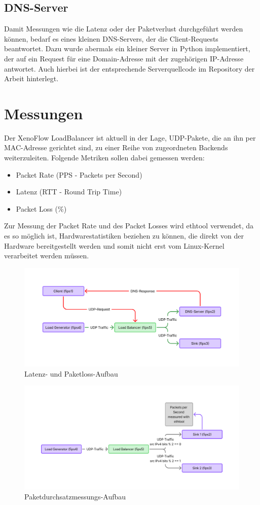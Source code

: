 \subsection{DNS-Server}
Damit Messungen wie die Latenz oder der Paketverlust durchgeführt werden können, bedarf es eines kleinen DNS-Servers, der die Client-Requests beantwortet. Dazu wurde abermals ein kleiner Server in Python implementiert, der auf ein Request für eine Domain-Adresse mit der zugehörigen IP-Adresse antwortet. Auch hierbei ist der entsprechende Serverquellcode im Repository der Arbeit hinterlegt.
\section{Messungen}
Der XenoFlow LoadBalancer ist aktuell in der Lage, UDP-Pakete, die an ihn per MAC-Adresse gerichtet sind, zu einer Reihe von zugeordneten Backends weiterzuleiten. Folgende Metriken sollen dabei gemessen werden: 
\begin{itemize}
    \item Packet Rate (PPS - Packets per Second)
    \item Latenz (RTT - Round Trip Time)
    \item Packet Loss (\%)
\end{itemize}
Zur Messung der Packet Rate und des Packet Losses wird ethtool verwendet, da es so möglich ist, Hardwarestatistiken beziehen zu können, die direkt von der Hardware bereitgestellt werden und somit nicht erst vom Linux-Kernel verarbeitet werden müssen.
\begin{figure}
    \centering
    \includegraphics[width=1\linewidth]{images/Messaufbau Latenz.png}
    \caption{Latenz- und Paketloss-Aufbau}
    \label{fig:enter-label}
\end{figure}
\begin{figure}
    \centering
    \includegraphics[width=1\linewidth]{images/Messaufbau PPS.png}
    \caption{Paketdurchsatzmessungs-Aufbau}
    \label{fig:enter-label}
\end{figure}
